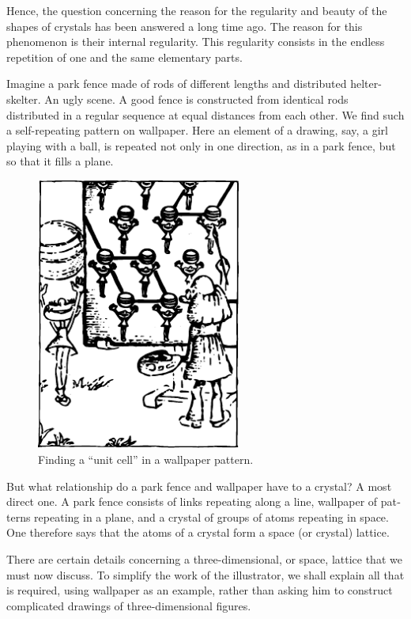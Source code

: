 Hence, the question concerning the reason for the regularity and beauty of the shapes of crystals has been answered a long time ago. The reason for this phenom­enon is their internal regularity. This regularity consists in the endless repetition of one and the same ele­mentary parts.

Imagine a park fence made of rods of different lengths and distributed helter-skelter. An ugly scene. A good fence is constructed from identical rods distributed in a regular sequence at equal distances from each other. We find such a self-repeating pattern on wallpaper. Here an element of a drawing, say, a girl playing with a ball, is repeated not only in one direction, as in a park fence, but so that it fills a plane.

\begin{figure}[!ht]
\centering
\includegraphics[width=0.6\textwidth]{figures/fig-02-10.pdf}
\caption{Finding a ``unit cell'' in a wallpaper pattern.}
\label{fig-2.10}
\end{figure}

But what relationship do a park fence and wallpaper have to a crystal? A most direct one. A park fence consists of links repeating along a line, wallpaper of pat­terns repeating in a plane, and a crystal of groups of atoms repeating in space. One therefore says that the atoms of a crystal form a space (or crystal) lattice.

There are certain details concerning a three-dimensional, or space, lattice that we must now discuss. To sim­plify the work of the illustrator, we shall explain all that is required, using wallpaper as an example, rather than asking him to construct complicated drawings of three-dimensional figures.

